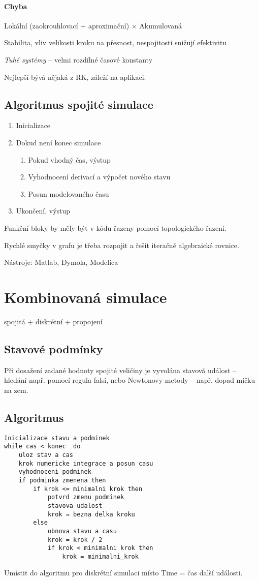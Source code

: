 \documentclass[a4wide]{report}
\begin{document}
\paragraph{Chyba}
Lokální (zaokrouhlovací + aproximační) $\times$ Akumulovaná

Stabilita, vliv velikosti kroku na přesnost, nespojitosti snižují efektivitu

\emph{Tuhé systémy} -- velmi rozdílné časové konstanty

Nejlepší bývá nějaká z RK, záleží na aplikaci.

\subsection{Algoritmus spojité simulace}
\begin{enumerate}
	\item Inicializace
	\item Dokud není konec simulace
	\begin{enumerate}
		\item Pokud vhodný čas, výstup
		\item Vyhodnocení derivací a výpočet nového stavu
		\item Posun modelovaného času
	\end{enumerate}
	\item Ukončení, výstup
\end{enumerate}

Funkční bloky by měly být v kódu řazeny pomocí topologického řazení.

Rychlé smyčky v grafu je třeba rozpojit a řešit iteračně algebraické rovnice.

Nástroje: Matlab, Dymola, Modelica

\section{Kombinovaná simulace}
spojitá + diskrétní + propojení

\subsection{Stavové podmínky}
Při dosažení zadané hodnoty spojité veličiny je vyvolána stavová událost -- hledání např. pomocí regula falsi, nebo Newtonovy metody -- např. dopad míčku na zem.

\subsection{Algoritmus}
\begin{lstlisting}
Inicializace stavu a podminek
while cas < konec  do
	uloz stav a cas
	krok numericke integrace a posun casu
	vyhodnoceni podminek
	if podminka zmenena then
		if krok <= minimalni krok then
			potvrd zmenu podminek
			stavova udalost
			krok = bezna delka kroku
		else
			obnova stavu a casu
			krok = krok / 2
			if krok < minimalni krok then
				krok = minimalni_krok
\end{lstlisting}
Umístit do algoritmu pro diskrétní simulaci místo Time = čas další události.
\end{document}

